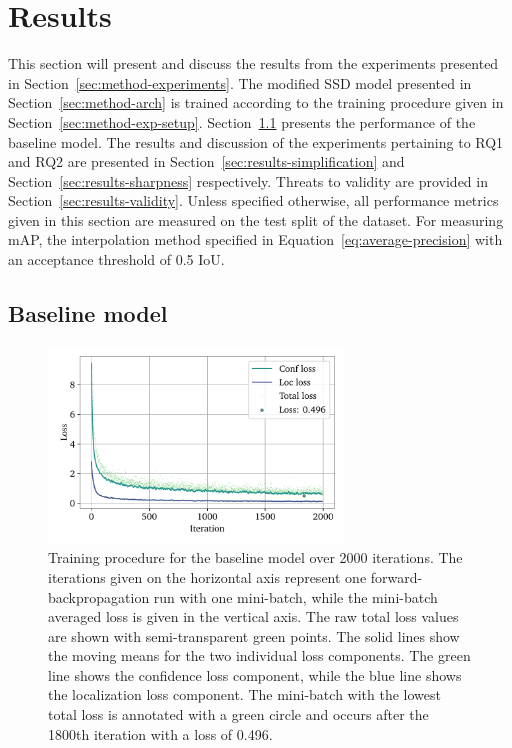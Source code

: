 \chapter{Results}\label{cha:results}

This section will present and discuss the results from the experiments presented in Section~\ref{sec:method-experiments}.
The modified SSD model presented in Section~\ref{sec:method-arch} is trained according to the training procedure given in Section~\ref{sec:method-exp-setup}.
Section~\ref{sec:results-baseline} presents the performance of the baseline model.
The results and discussion of the experiments pertaining to RQ1 and RQ2 are presented in Section~\ref{sec:results-simplification} and Section~\ref{sec:results-sharpness} respectively.
Threats to validity are provided in Section~\ref{sec:results-validity}.
Unless specified otherwise, all performance metrics given in this section are measured on the test split of the dataset.
For measuring mAP, the interpolation method specified in Equation~\ref{eq:average-precision} with an acceptance threshold of 0.5 IoU.

\section{Baseline model}\label{sec:results-baseline}
\begin{figure}[htbp]
    \centering
    \includegraphics[width=0.7\textwidth]{figs/results/baseline/loss2.pdf}
    \caption[Baseline training procedure]{%
Training procedure for the baseline model over 2000 iterations.
The iterations given on the horizontal axis represent one forward-backpropagation run with one mini-batch, while the mini-batch averaged loss is given in the vertical axis.
The raw total loss values are shown with semi-transparent green points.
The solid lines show the moving means for the two individual loss components.
The green line shows the confidence loss component, while the blue line shows the localization loss component.
The mini-batch with the lowest total loss is annotated with a green circle and occurs after the 1800th iteration with a loss of 0.496.
    }\label{fig:method-baseline-loss}
  \end{figure}

